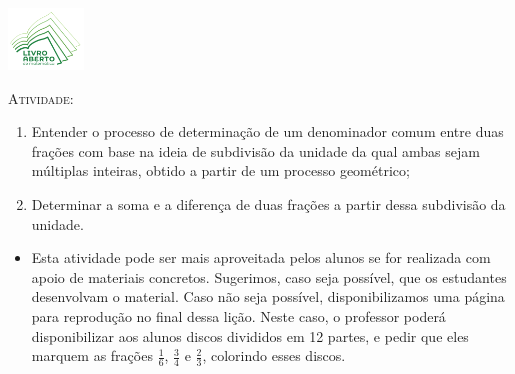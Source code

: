 \documentclass[10 pt,usenames,dvipsnames, oneside]{article}
\begin{document}
\begin{center}
  \begin{minipage}[l]{3cm}
\includegraphics[width=2cm]{../../../Figuras/logo}       
\end{minipage}\hfill
\begin{minipage}[r]{.8\textwidth}
 {\Large \scshape Atividade: }  
\end{minipage}
\end{center}
\vspace{.2cm}

\ifdefined\prof
\begin{goals}
\begin{enumerate}
  \item      Entender o processo de determinação de um denominador comum entre duas frações com base na ideia de subdivisão da unidade da qual ambas sejam múltiplas inteiras, obtido a partir de um processo geométrico;
  \item      Determinar a soma e a diferença de duas frações a partir dessa subdivisão da unidade.
\end{enumerate}

\tcblower

\begin{itemize}
  \item      Esta atividade pode ser mais aproveitada pelos alunos se for realizada com apoio de materiais concretos. Sugerimos, caso seja possível, que os estudantes desenvolvam o material. Caso não seja possível, disponibilizamos uma página para reprodução no final dessa lição. Neste caso, o professor poderá disponibilizar aos alunos discos divididos em 12 partes, e pedir que eles marquem as frações     $\frac{1}{6}$,     $\frac{3}{4}$     e     $\frac{2}{3}$,     colorindo esses discos.



\end{itemize}
\end{goals}
\end{document}
